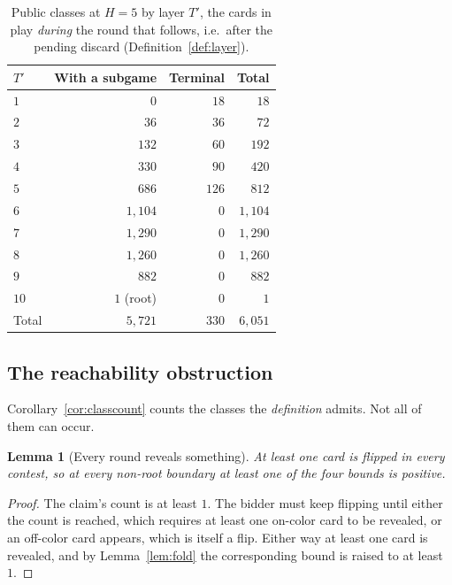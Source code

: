 \documentclass[11pt]{article}
\theoremstyle{plain}
\newtheorem{lemma}[theorem]{Lemma}
\theoremstyle{definition}
\theoremstyle{remark}
\begin{document}
\begin{table}[t]
\centering
\caption{Public classes at $H=5$ by layer $T'$, the cards in play
\emph{during} the round that follows, i.e.\ after the pending discard
(Definition~\ref{def:layer}).}
\label{tab:layers}
\begin{tabular}{@{}lrrr@{}}
\toprule
$T'$ & With a subgame & Terminal & Total\\
\midrule
$1$  & $0$      & $18$  & $18$\\
$2$  & $36$     & $36$  & $72$\\
$3$  & $132$    & $60$  & $192$\\
$4$  & $330$    & $90$  & $420$\\
$5$  & $686$    & $126$ & $812$\\
$6$  & $1{,}104$  & $0$   & $1{,}104$\\
$7$  & $1{,}290$  & $0$   & $1{,}290$\\
$8$  & $1{,}260$  & $0$   & $1{,}260$\\
$9$  & $882$    & $0$   & $882$\\
$10$ & $1$ (root) & $0$   & $1$\\
\midrule
Total & $5{,}721$ & $330$ & $6{,}051$\\
\bottomrule
\end{tabular}
\end{table}

\subsection{The reachability obstruction}\label{sec:reach}

Corollary~\ref{cor:classcount} counts the classes the \emph{definition}
admits. Not all of them can occur.

\begin{lemma}[Every round reveals something]\label{lem:atleastone}
At least one card is flipped in every contest, so at every non-root
boundary at least one of the four bounds is positive.
\end{lemma}

\begin{proof}
The claim's count is at least $1$. The bidder must keep flipping until
either the count is reached, which requires at least one on-color card to
be revealed, or an off-color card appears, which is itself a flip. Either
way at least one card is revealed, and by Lemma~\ref{lem:fold} the
corresponding bound is raised to at least $1$.
\end{proof}
\end{document}
